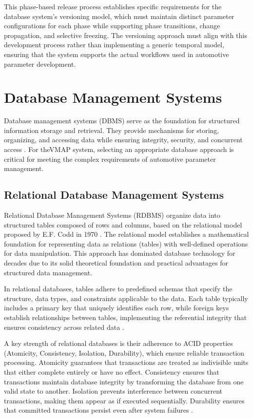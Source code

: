 This phase-based release process establishes specific requirements for the database system's versioning model, which must maintain distinct parameter configurations for each phase while supporting phase transitions, change propagation, and selective freezing. The versioning approach must align with this development process rather than implementing a generic temporal model, ensuring that the system supports the actual workflows used in automotive parameter development.


\section{Database Management Systems}
\label{sec:database-management-systems}

Database management systems (DBMS) serve as the foundation for structured information storage and retrieval. They provide mechanisms for storing, organizing, and accessing data while ensuring integrity, security, and concurrent access \cite{elmasri2015fundamentals}. For the\ac{VMAP} system, selecting an appropriate database approach is critical for meeting the complex requirements of automotive parameter management.

\subsection{Relational Database Management Systems}
\label{subsec:relational-database-management-systems}

Relational Database Management Systems (RDBMS) organize data into structured tables composed of rows and columns, based on the relational model proposed by E.F. Codd in 1970 \cite{codd1970relational}. The relational model establishes a mathematical foundation for representing data as relations (tables) with well-defined operations for data manipulation. This approach has dominated database technology for decades due to its solid theoretical foundation and practical advantages for structured data management.

In relational databases, tables adhere to predefined schemas that specify the structure, data types, and constraints applicable to the data. Each table typically includes a primary key that uniquely identifies each row, while foreign keys establish relationships between tables, implementing the referential integrity that ensures consistency across related data \cite{elmasri2015fundamentals}.

A key strength of relational databases is their adherence to ACID properties (Atomicity, Consistency, Isolation, Durability), which ensure reliable transaction processing. Atomicity guarantees that transactions are treated as indivisible units that either complete entirely or have no effect. Consistency ensures that transactions maintain database integrity by transforming the database from one valid state to another. Isolation prevents interference between concurrent transactions, making them appear as if executed sequentially. Durability ensures that committed transactions persist even after system failures \cite{elmasri2015fundamentals}.

